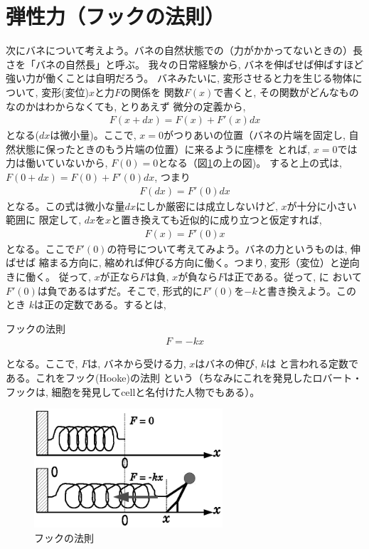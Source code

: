 \section{弾性力（フックの法則）}

次にバネについて考えよう。バネの自然状態での（力がかかってないときの）長さを「バネの自然長」と呼ぶ。
我々の日常経験から, バネを伸ばせば伸ばすほど強い力が働くことは自明だろう。
バネみたいに, 変形させると力を生じる物体について, 変形(変位)$x$と力$F$の関係を
関数$F(x)$で書くと, その関数がどんなものなのかはわからなくても, とりあえず
微分の定義から, 
\begin{eqnarray}F(x+dx)=F(x)+F'(x)dx\end{eqnarray}
となる($dx$は微小量)。ここで, $x=0$がつりあいの位置（バネの片端を固定し, 
自然状態に保ったときのもう片端の位置）に来るように座標を
とれば, $x=0$では力は働いていないから, $F(0)=0$となる（図\ref{fig:spring}の上の図)。
すると上の式は, $F(0+dx)=F(0)+F'(0)dx$, つまり
\begin{eqnarray}
F(dx)=F'(0)dx
\end{eqnarray}
となる。この式は微小な量$dx$にしか厳密には成立しないけど, $x$が十分に小さい範囲に
限定して, $dx$を$x$と置き換えても近似的に成り立つと仮定すれば, 
\begin{eqnarray}
F(x)=F'(0)x\label{eq:HookeLaw3}
\end{eqnarray}
となる。ここで$F'(0)$の符号について考えてみよう。バネの力というものは, 伸ばせば
縮まる方向に, 縮めれば伸びる方向に働く。つまり, 変形（変位）と逆向きに働く。
従って, $x$が正なら$F$は負, $x$が負なら$F$は正である。従って, に
おいて$F'(0)$は負であるはずだ。そこで, 形式的に$F'(0)$を$-k$と書き換えよう。このとき
$k$は正の定数である。するとは, 
\begin{itembox}{フックの法則}
\begin{eqnarray}
F=-kx\label{eq:Hooke}
\end{eqnarray}
\end{itembox}
となる。ここで, $F$は, バネから受ける力, $x$はバネの伸び, $k$は
と言われる定数である。これをフック(Hooke)の法則
という（ちなみにこれを発見したロバート・フックは, 
細胞を発見してcellと名付けた人物でもある）。
\begin{figure}[h]
    \centering
    \includegraphics[width=7cm]{spring.eps}
    \caption{フックの法則}\label{fig:spring}
\end{figure}

